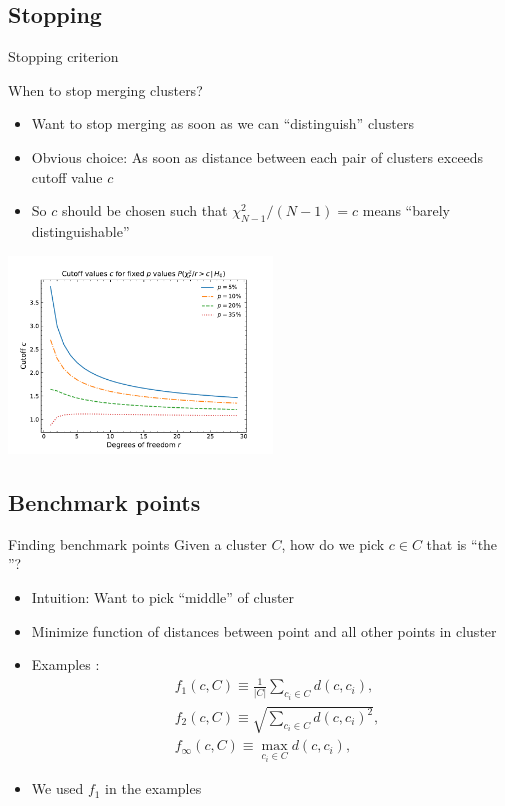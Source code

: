 \subsection{Stopping}
\begin{frame}{Stopping criterion}
	\begin{block}{When to stop merging clusters?}
		\begin{itemize}
			\item Want to stop merging as soon as we can \enquote{distinguish} clusters
			\item Obvious choice: As soon as distance between each pair of clusters exceeds cutoff value $c$ 
			\item So $c$ should be chosen such that $\chi^2_{N-1}/(N-1)=c$ means \enquote{barely distinguishable}
		\end{itemize}
	{\centering
	\includegraphics[width=7cm,clip,trim=0cm 0cm 0cm 0.75cm]{figures/erratum-plots/cutoff_values.pdf}\par}
	\end{block}
\end{frame}
%
\subsection{Benchmark points}
\begin{frame}{Finding benchmark points}
	Given a cluster $C$, how do we pick $c\in C$ that is \enquote{the }?
	\begin{itemize}[<+->]
		\item Intuition: Want to pick \enquote{middle} of cluster
		\item Minimize function of distances between point and all other points in cluster
		\item Examples :
		\begin{align*}%
		&f_1(c, C) \equiv \frac 1{|C|}\sum_{c_i\in C} d(c, c_i),\\
		&f_2(c, C) \equiv \sqrt{\sum_{c_i\in C} d(c, c_i)^2},\\
		&f_\infty(c, C) \equiv \max_{c_i\in C} d(c, c_i),
		\end{align*}
		\item We used $f_1$ in the examples
	\end{itemize}
	
	
\end{frame}
%